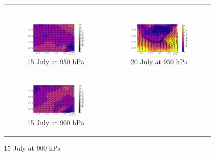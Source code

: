 \begin{figure}[hbtp]
\begin{tabular}{cc}
\begin{subfigure}[t]{0.5\textwidth}
        \end{subfigure} \\
        \begin{subfigure}[t]{0.5\textwidth}
            \caption{15 July at 950 hPa}
            \includegraphics[width=\textwidth]{images/chap6/IOP_maps/mesoNH_wind_950_2021-07-15T12:00:00.png}
        \end{subfigure} &
        \begin{subfigure}[t]{0.5\textwidth}
            \caption{20 July at 950 hPa}
            \includegraphics[width=\textwidth]{images/chap6/IOP_maps/mesoNH_wind_950_2021-07-20T12:00:00.png}
        \end{subfigure} \\
        \begin{subfigure}[t]{0.5\textwidth}
            \caption{15 July at 900 hPa}
            \includegraphics[width=\textwidth]{images/chap6/IOP_maps/mesoNH_wind_900_2021-07-15T12:00:00.png}

\end{subfigure}
\end{tabular}
\end{figure}
